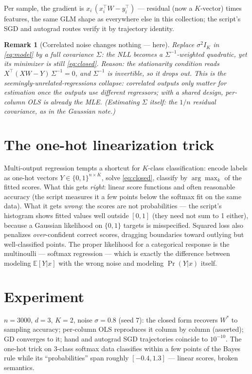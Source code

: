 \documentclass[11pt]{article}
\newtheorem{remark}{Remark}
\begin{document}
Per sample, the gradient is $x_i\,(x_i^\top W - y_i^\top)$ --- residual
(now a $K$-vector) times features, the same GLM shape as everywhere else
in this collection; the script's SGD and autograd routes verify it by
trajectory identity.

\begin{remark}[Correlated noise changes nothing --- here]
Replace $\sigma^2 I_K$ in \eqref{eq:model} by a full covariance
$\Sigma$: the NLL becomes a $\Sigma^{-1}$-weighted quadratic, yet its
minimizer is still \eqref{eq:closed}. Reason: the stationarity condition
reads $X^\top (XW - Y)\,\Sigma^{-1} = 0$, and $\Sigma^{-1}$ is
invertible, so it drops out. This is the seemingly-unrelated-regressions
collapse: correlated outputs only matter for estimation once the outputs
use \emph{different} regressors; with a shared design, per-column OLS is
already the MLE. (Estimating $\Sigma$ itself: the $1/n$ residual
covariance, as in the Gaussian note.)
\end{remark}

\section{The one-hot linearization trick}

Multi-output regression tempts a shortcut for $K$-class classification:
encode labels as one-hot vectors $Y \in \{0,1\}^{n\times K}$, solve
\eqref{eq:closed}, classify by $\arg\max_k$ of the fitted scores. What
this gets \emph{right}: linear score functions and often reasonable
accuracy (the script measures it a few points below the softmax fit on
the same data). What it gets \emph{wrong}: the scores are not
probabilities --- the script's histogram shows fitted values well outside
$[0,1]$ (they need not sum to 1 either), because a Gaussian likelihood on
$\{0,1\}$ targets is misspecified. Squared loss also penalizes
\emph{over}-confident correct scores, dragging boundaries toward outlying
but well-classified points. The proper likelihood for a categorical
response is the multinoulli --- softmax regression --- which is exactly
the difference between modeling $\mathbb{E}[Y|x]$ with the wrong noise
and modeling $\Pr(Y|x)$ itself.

\section{Experiment}

$n = 3000$, $d = 3$, $K = 2$, noise $\sigma = 0.8$ (seed 7): the closed
form recovers $W^\ast$ to sampling accuracy; per-column OLS reproduces it
column by column (asserted); GD converges to it; hand and autograd SGD
trajectories coincide to $10^{-10}$. The one-hot trick on 3-class softmax
data classifies within a few points of the Bayes rule while its
``probabilities'' span roughly $[-0.4, 1.3]$ --- linear scores, broken
semantics.
\end{document}

